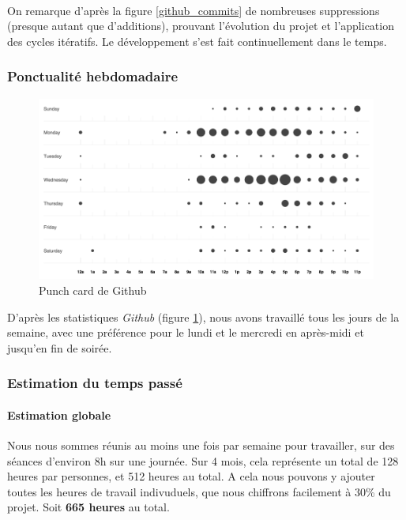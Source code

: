 \paragraph{}
On remarque d'après la figure \ref{github_commits} de nombreuses suppressions (presque autant que d’additions), prouvant l’évolution du projet et l’application des cycles itératifs. Le développement s’est fait continuellement dans le temps.

\subsubsection{Ponctualité hebdomadaire}

\begin{figure}[H]\centering
  \includegraphics[scale=.8]{./img/punchcard.png}
  \caption{Punch card de Github}
  \label{punchcard}
\end{figure}

D’après les statistiques \emph{Github} (figure \ref{punchcard}), nous avons travaillé tous les jours de la semaine, avec une préférence pour le lundi et le mercredi en après-midi et jusqu’en fin de soirée.

\subsubsection{Estimation du temps passé}

\paragraph{Estimation globale}
Nous nous sommes réunis au moins une fois par semaine pour travailler, sur des séances d'environ 8h sur une journée. Sur 4 mois, cela représente un total de 128 heures par personnes, et 512 heures au total. A cela nous pouvons y ajouter toutes les heures de travail indivuduels, que nous chiffrons facilement à 30\% du projet. Soit \textbf{665 heures} au total.

